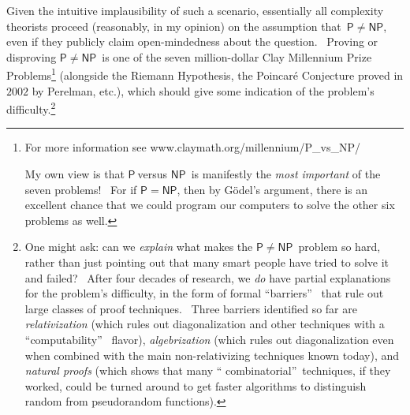 \documentclass[12pt,onecolumn]{article}%
\begin{document}
Given the intuitive implausibility of such a scenario, essentially all
complexity theorists proceed (reasonably, in my opinion) on the assumption
that\ $\mathsf{P}\neq\mathsf{NP}$, even if they publicly claim open-mindedness
about the question. \ Proving or disproving $\mathsf{P}\neq\mathsf{NP}$\ is
one of the seven million-dollar Clay Millennium Prize Problems\footnote{For
more information see www.claymath.org/millennium/P\_vs\_NP/
\par
My own view is that $\mathsf{P}\ $versus $\mathsf{NP}$\ is manifestly the
\textit{most important} of the seven problems! \ For if $\mathsf{P}%
=\mathsf{NP}$, then by G\"{o}del's argument, there is an excellent chance that
we could program our computers to solve the other six problems as well.}
(alongside the Riemann Hypothesis, the Poincar\'{e} Conjecture proved in
$2002$ by Perelman, etc.), which should give some indication of the problem's
difficulty.\footnote{One might ask: can we \textit{explain} what makes the
$\mathsf{P}\neq\mathsf{NP}$\ problem so hard, rather than just pointing out
that many smart people have tried to solve it and failed? \ After four decades
of research, we \textit{do} have partial explanations for the problem's
difficulty, in the form of formal \textquotedblleft barriers\textquotedblright%
\ that rule out large classes of proof techniques. \ Three barriers identified
so far are \textit{relativization} \cite{bgs} (which rules out diagonalization
and other techniques with a \textquotedblleft computability\textquotedblright%
\ flavor), \textit{algebrization} \cite{awig} (which rules out diagonalization
even when combined with the main non-relativizing techniques known today), and
\textit{natural proofs} \cite{rr} (which shows that many \textquotedblleft
combinatorial\textquotedblright\ techniques, if they worked, could be turned
around to get faster algorithms to distinguish random from pseudorandom
functions).}
\end{document}
